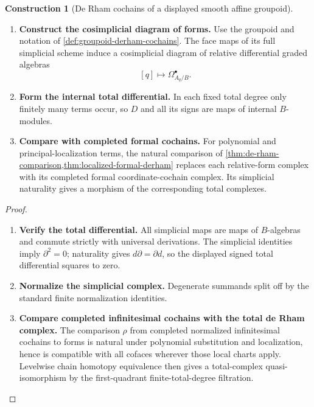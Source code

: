 \documentclass[11pt,a4paper]{article}
\numberwithin{algorithm}{section}
\numberwithin{equation}{section}
\theoremstyle{definition}
\theoremstyle{remark}
\theoremstyle{plain}
\theoremstyle{definition}
\newtheorem{construction}[construction]{Construction}
\theoremstyle{plain}
\begin{document}
\begin{construction}[De Rham cochains of a displayed smooth affine groupoid]
\label{constr:artin-derham}\leavevmode
\begin{enumerate}[leftmargin=*,align=left]
\item \textbf{Construct the cosimplicial diagram of forms.}
Use the groupoid and notation of \cref{def:groupoid-derham-cochains}.
The face maps of its full simplicial scheme induce a cosimplicial diagram of relative differential
graded algebras
\[
 [q]\longmapsto\Omega^\bullet_{A_q/B}.
\]
\item \textbf{Form the internal total differential.}
In each fixed total degree only finitely many terms occur,
so $D$ and all its signs are maps of internal $B$-modules.
\item \textbf{Compare with completed formal cochains.}
For polynomial and principal-localization terms, the natural
comparison of \cref{thm:de-rham-comparison,thm:localized-formal-derham}
replaces each relative-form complex with its completed formal
coordinate-cochain complex.  Its simplicial naturality gives
a morphism of the corresponding total complexes.
\end{enumerate}
\end{construction}
\begin{proof}\leavevmode
\begin{enumerate}[leftmargin=*,align=left]
\item \textbf{Verify the total differential.}
All simplicial maps are maps of $B$-algebras and commute
strictly with universal derivations.  The simplicial
identities imply $\partial^2=0$; naturality gives
$d\partial=\partial d$, so the displayed signed total
differential squares to zero.

\item \textbf{Normalize the simplicial complex.}
Degenerate summands split off
by the standard finite normalization identities.

\item \textbf{Compare completed infinitesimal cochains with the total de Rham complex.}
The
comparison $\rho$ from completed normalized infinitesimal
cochains to forms is natural under polynomial substitution
and localization, hence is compatible with all
cofaces wherever those local charts apply.  Levelwise
chain homotopy equivalence then gives a total-complex
quasi-isomorphism by the first-quadrant finite-total-degree
filtration.
\end{enumerate}
\end{proof}
\end{document}
